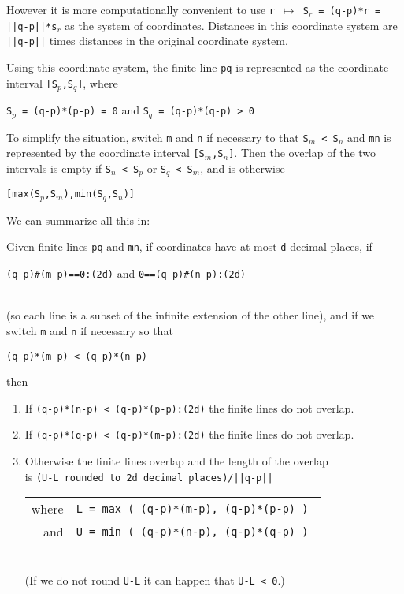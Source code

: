 \documentclass[12pt]{article}
\begin{document}
However it is more computationally convenient to use
{\tt r $\mapsto$ S$_r$ = (q-p)*r = ||q-p||*s$_r$} as the system of coordinates.
Distances in this coordinate system are {\tt ||q-p||} times distances in the
original coordinate system.

Using this coordinate system, the finite line {\tt pq} is represented
as the coordinate interval {\tt [S$_p$,S$_q$]}, where \\
\centerline{{\tt S$_p$ = (q-p)*(p-p) = 0} and {\tt S$_q$ = (q-p)*(q-p) > 0 }}
To simplify
the situation, switch {\tt m} and {\tt n} if necessary to that
{\tt S$_m$ < S$_n$} and {\tt mn} is represented by the coordinate
interval {\tt [S$_m$,S$_n$]}.  Then the overlap of the two intervals
is empty if {\tt S$_n$ < S$_p$} or {\tt S$_q$ < S$_m$}, and is
otherwise \\
\centerline{\tt [max(S$_p$,S$_m$),min(S$_q$,S$_n$)]}

We can summarize all this in:
\begin{lemma}
Given finite lines {\tt pq} and {\tt mn},
if coordinates have at most {\tt d} decimal places, if
\\[1ex]
\centerline{{\tt (q-p)\#(m-p)==0:(2d)} and {\tt 0==(q-p)\#(n-p):(2d)}}
\\[1ex]
(so each line is a subset of the infinite extension of the other line),
and if we switch {\tt m} and {\tt n} if necessary so that \\
\centerline{\tt (q-p)*(m-p) < (q-p)*(n-p)}
then
\begin{enumerate}
\item If {\tt (q-p)*(n-p) < (q-p)*(p-p):(2d)} the finite lines do not overlap.
\item If {\tt (q-p)*(q-p) < (q-p)*(m-p):(2d)} the finite lines do not overlap.
\item Otherwise the finite lines overlap and the length of the overlap \\
is {\tt (U-L {\rm rounded to} {\tt 2d} {\rm decimal places})/||q-p||} \\
\hspace*{0.5in}\begin{tabular}{rl}
where	& \tt L = max ( (q-p)*(m-p), (q-p)*(p-p) ) \\
and	& \tt U = min ( (q-p)*(n-p), (q-p)*(q-p) ) \\
\end{tabular} \\
(If we do not round {\tt U-L} it can happen that {\tt U-L < 0}.)
\end{enumerate}
\end{lemma}
\end{document}
